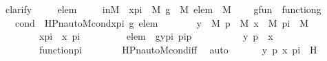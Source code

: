 \begin{isabellebody}
\isamarkupfalse%
\ {\isacharparenleft}{\kern0pt}clarify{\isacharparenright}{\kern0pt}\ \isanewline
\ \ \isamarkupfalse%
\ elem\ \isanewline
\ \ \isamarkupfalse%
\ inM\ {\isacharcolon}{\kern0pt}\ {\isachardoublequoteopen}x{\isacharunderscore}{\kern0pt}pi\ {\isasymin}\ M{\isachardoublequoteclose}\ {\isachardoublequoteopen}g\ {\isasymin}\ M{\isachardoublequoteclose}\ {\isachardoublequoteopen}elem\ {\isasymin}\ M{\isachardoublequoteclose}\ \isanewline
\ \ \ gfun\ {\isacharcolon}{\kern0pt}\ {\isachardoublequoteopen}function{\isacharparenleft}{\kern0pt}g{\isacharparenright}{\kern0pt}{\isachardoublequoteclose}\ \isanewline
\ \ \ cond\ {\isacharcolon}{\kern0pt}\ {\isachardoublequoteopen}HPn{\isacharunderscore}{\kern0pt}auto{\isacharunderscore}{\kern0pt}M{\isacharunderscore}{\kern0pt}cond{\isacharparenleft}{\kern0pt}x{\isacharunderscore}{\kern0pt}pi{\isacharcomma}{\kern0pt}\ g{\isacharcomma}{\kern0pt}\ elem{\isacharparenright}{\kern0pt}{\isachardoublequoteclose}\ \isanewline
\isanewline
\ \ \isamarkupfalse%
\ \isamarkupfalse%
\ {\isachardoublequoteopen}\ {\isacharparenleft}{\kern0pt}{\isasymexists}y\ {\isasymin}\ M{\isachardot}{\kern0pt}\ {\isasymexists}p\ {\isasymin}\ M{\isachardot}{\kern0pt}\ {\isasymexists}x\ {\isasymin}\ M{\isachardot}{\kern0pt}\ {\isasymexists}pi\ {\isasymin}\ M{\isachardot}{\kern0pt}\ \isanewline
\ \ \ \ \ \ \ \ x{\isacharunderscore}{\kern0pt}pi\ {\isacharequal}{\kern0pt}\ {\isacharless}{\kern0pt}x{\isacharcomma}{\kern0pt}\ pi{\isachargreater}{\kern0pt}\ {\isasymand}\isanewline
\ \ \ \ \ \ \ \ elem\ {\isacharequal}{\kern0pt}\ {\isacharless}{\kern0pt}g{\isacharbackquote}{\kern0pt}{\isacharless}{\kern0pt}y{\isacharcomma}{\kern0pt}pi{\isachargreater}{\kern0pt}{\isacharcomma}{\kern0pt}\ pi{\isacharbackquote}{\kern0pt}p{\isachargreater}{\kern0pt}\ {\isasymand}\ \isanewline
\ \ \ \ \ \ \ \ {\isacharless}{\kern0pt}y{\isacharcomma}{\kern0pt}\ p{\isachargreater}{\kern0pt}\ {\isasymin}\ x\ {\isasymand}\ \isanewline
\ \ \ \ \ \ \ \ function{\isacharparenleft}{\kern0pt}pi{\isacharparenright}{\kern0pt}\isanewline
\ \ \ \ \ {\isacharparenright}{\kern0pt}{\isachardoublequoteclose}\ \isamarkupfalse%
\ HPn{\isacharunderscore}{\kern0pt}auto{\isacharunderscore}{\kern0pt}M{\isacharunderscore}{\kern0pt}cond{\isacharunderscore}{\kern0pt}iff\ \isamarkupfalse%
\ auto\ \isanewline
\ \ \isamarkupfalse%
\ \isamarkupfalse%
\ y\ p\ x\ pi\ \ H\ {\isacharcolon}{\kern0pt}\ \isanewline

\end{isabellebody}
